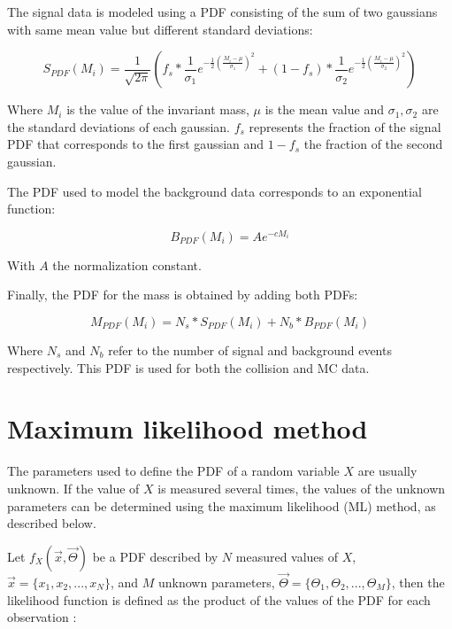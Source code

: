 The signal data is modeled using a PDF consisting of the sum of two gaussians with same mean value but different standard deviations:

\begin{equation}
S_{PDF}(M_i) = \frac{1}{\sqrt{2\pi}} \left(f_s*\frac{1}{\sigma_1}e^{-\frac{1}{2}\left(\frac{M_i-\mu}{\sigma_1}\right)^2} + (1 - f_s)*\frac{1}{\sigma_2}e^{-\frac{1}{2}\left(\frac{M_i-\mu}{\sigma_2}\right)^2}\right)
\end{equation}

Where $M_i$ is the value of the invariant mass, $\mu$ is the mean value and $\sigma_1, \sigma_2$ are the standard deviations of each gaussian. $f_s$ represents the fraction of the signal PDF that corresponds to the first gaussian and $1-f_s$ the fraction of the second gaussian. 

The PDF used to model the background data corresponds to an exponential function:

\begin{equation}
B_{PDF}(M_i) = A e^{-cM_i}
\end{equation}

With $A$ the normalization constant. 

Finally, the PDF for the mass is obtained by adding both PDFs:

\begin{equation}
M_{PDF}(M_i) = N_s*S_{PDF}(M_i)  + N_b*B_{PDF}(M_i)
\label{eq:masspdf}
\end{equation}

Where $N_s$ and $N_b$ refer to the number of signal and background events respectively. This PDF is used for both the collision and MC data.

\section{Maximum likelihood method}
The parameters used to define the PDF of a random variable $X$ are usually unknown. If the value of $X$ is measured several times, the values of the unknown parameters can be determined using the maximum likelihood (ML) method, as described below.

Let $f_X(\vec{x}, \vec{\Theta} )$ be a PDF described by $N$ measured values of $X$, $\vec{x} = \{x_1, x_2, ..., x_N\}$, and $M$ unknown parameters, $\vec{\Theta} = \{\Theta_1, \Theta_2, ..., \Theta_M \}$, then the likelihood function is defined as the product of the values of the PDF for each observation \cite{bonanomi2021response,vsirca2016probability}:

